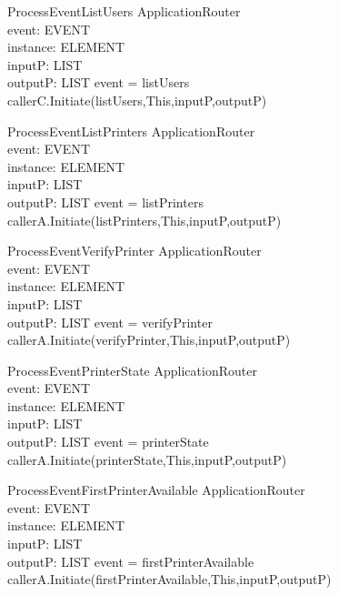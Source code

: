 \begin{schema}{ProcessEventListUsers}
\Delta ApplicationRouter \\
event: EVENT \\
instance: ELEMENT \\
inputP: LIST \\
outputP: LIST
\where event = listUsers \\
callerC.Initiate(listUsers,This,inputP,outputP)
\end{schema}

\begin{schema}{ProcessEventListPrinters}
\Delta ApplicationRouter \\
event: EVENT \\
instance: ELEMENT \\
inputP: LIST \\
outputP: LIST
\where event = listPrinters \\
callerA.Initiate(listPrinters,This,inputP,outputP)
\end{schema}

\begin{schema}{ProcessEventVerifyPrinter}
\Delta ApplicationRouter \\
event: EVENT \\
instance: ELEMENT \\
inputP: LIST \\
outputP: LIST
\where event = verifyPrinter \\
callerA.Initiate(verifyPrinter,This,inputP,outputP)
\end{schema}

\begin{schema}{ProcessEventPrinterState}
\Delta ApplicationRouter \\
event: EVENT \\
instance: ELEMENT \\
inputP: LIST \\
outputP: LIST
\where event = printerState \\
callerA.Initiate(printerState,This,inputP,outputP)
\end{schema}

\begin{schema}{ProcessEventFirstPrinterAvailable}
\Delta ApplicationRouter \\
event: EVENT \\
instance: ELEMENT \\
inputP: LIST \\
outputP: LIST
\where event = firstPrinterAvailable \\
callerA.Initiate(firstPrinterAvailable,This,inputP,outputP)
\end{schema}

